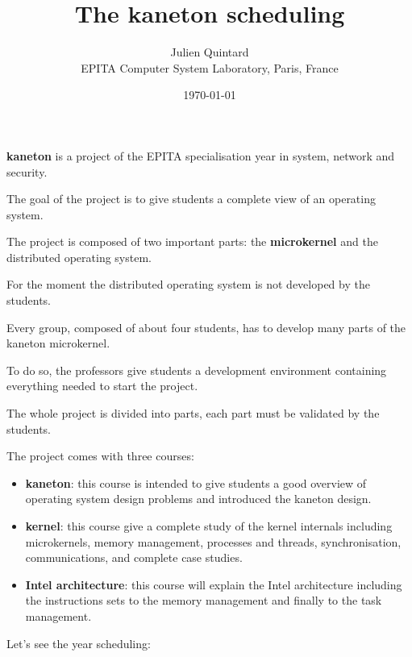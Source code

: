 \documentclass[10pt,a4wide]{article}
\title{The kaneton scheduling}
\author{\small{Julien Quintard} \\
        \scriptsize{EPITA Computer System Laboratory, Paris, France}}
\date{\scriptsize{\today}}
\begin{document}
\maketitle

%
%

\begin{multicols}{2}



\textbf{kaneton} is a project of the EPITA specialisation year in system,
network and security.

The goal of the project is to give students a complete view of an operating
system.

The project is composed of two important parts: the \textbf{microkernel}
and the {distributed operating system}.

For the moment the distributed operating system is not developed by the
students.

Every group, composed of about four students, has to develop many parts
of the kaneton microkernel.

To do so, the professors give students a development environment containing
everything needed to start the project.

The whole project is divided into parts, each part must be validated by
the students.

The project comes with three courses:

\begin{itemize}
  \item
    \textbf{kaneton}: this course is intended to give students a good overview
    of operating system design problems and introduced the kaneton design.
  \item
    \textbf{kernel}: this course give a complete study of the kernel
    internals including microkernels, memory management, processes and threads,
    synchronisation, communications, and complete case studies.
  \item
    \textbf{Intel architecture}: this course will explain the Intel
    architecture including the instructions sets to the memory management
    and finally to the task management.
\end{itemize}

Let's see the year scheduling:


\end{multicols}
\end{document}
